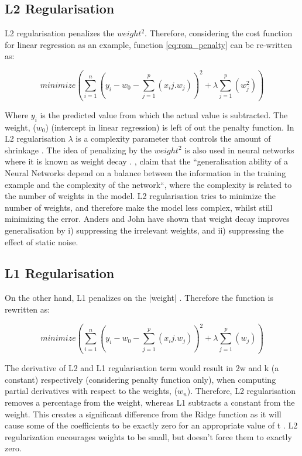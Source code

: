 \subsection{L2 Regularisation} 


L2 regularisation penalizes the $weight^2$. Therefore, considering the cost function for linear regression as an example, function \ref{eq:rom_penalty} can be re-written as:

\begin{equation}\label{rom_l2}
minimize ( \sum^{n}_{i=1}(y_i - w_0 - \sum^{p}_{j=1}(x_ij.w_j) )^2 + \lambda\sum^{p}_{j=1}(w_j^2) )
\end{equation}

Where $y_i$ is the predicted value from which the actual value is subtracted. The weight, ($w_0$) (intercept in linear regression) is left of out the penalty function. In L2 regularisation $\lambda$ is a complexity parameter that controls the amount of shrinkage \citep{friedman2001elements}.  The idea of penalizing by the $weight^2$ is also used in neural networks where it is known as weight decay \citep{krogh1992simple,moody1992effective}. \citet{krogh1992simple}, claim that the ``generalisation ability of a Neural Networks depend on a balance between the information in the training example and the complexity of the network``, where the complexity is related to the number of weights in the model. L2 regularisation tries to minimize the number of weights, and therefore make the model less complex, whilst still minimizing the error. Anders and John have shown that weight decay improves generalisation by i) suppressing the irrelevant weights, and ii) suppressing the effect of static noise. 



\subsection{L1 Regularisation} 


On the other hand, L1 penalizes on the |weight| \citep{friedman2001elements}. Therefore the function is rewritten as:

\begin{equation}\label{rom_l1}
minimize ( \sum^{n}_{i=1}(y_i - w_0 - \sum^{p}_{j=1}(x_ij.w_j) )^2 + \lambda\sum^{p}_{j=1}(w_j) )
\end{equation}

The derivative of L2 and L1 regularisation term would result in 2w and k (a constant) respectively (considering penalty function only), when computing partial derivatives with respect to the weights, ($w_n$). Therefore, L2 regularisation removes a percentage from the weight, whereas L1 subtracts a constant from the weight. This creates a significant difference from the Ridge function as it will cause some of the coefficients to be exactly zero for an appropriate value of t \citep{friedman2001elements}. L2 regularization encourages weights to be small, but doesn't force them to exactly zero.

